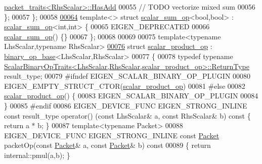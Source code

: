 \begin{DoxyCode}
      \hyperlink{struct_eigen_1_1internal_1_1packet__traits}{packet\_traits<RhsScalar>::HasAdd}
00055     \textcolor{comment}{// TODO vectorize mixed sum}
00056   \};
00057 \};
00058 
\hyperlink{struct_eigen_1_1internal_1_1scalar__sum__op_3_01bool_00_01bool_01_4}{00064} \textcolor{keyword}{template}<> \textcolor{keyword}{struct }\hyperlink{struct_eigen_1_1internal_1_1scalar__sum__op}{scalar\_sum\_op}<bool,bool> : \hyperlink{struct_eigen_1_1internal_1_1scalar__sum__op}{scalar\_sum\_op}<int,int> \{
00065   EIGEN\_DEPRECATED
00066   \hyperlink{struct_eigen_1_1internal_1_1scalar__sum__op}{scalar\_sum\_op}() \{\}
00067 \};
00068 
00069 
00075 \textcolor{keyword}{template}<\textcolor{keyword}{typename} LhsScalar,\textcolor{keyword}{typename} RhsScalar>
\hyperlink{struct_eigen_1_1internal_1_1scalar__product__op}{00076} \textcolor{keyword}{struct }\hyperlink{struct_eigen_1_1internal_1_1scalar__product__op}{scalar\_product\_op}  : \hyperlink{struct_eigen_1_1internal_1_1binary__op__base}{binary\_op\_base}<LhsScalar,RhsScalar>
00077 \{
00078   \textcolor{keyword}{typedef} \textcolor{keyword}{typename} 
      \hyperlink{group___core___module_struct_eigen_1_1_scalar_binary_op_traits}{ScalarBinaryOpTraits<LhsScalar,RhsScalar,scalar\_product\_op>::ReturnType}
       result\_type;
00079 \textcolor{preprocessor}{#ifndef EIGEN\_SCALAR\_BINARY\_OP\_PLUGIN}
00080   EIGEN\_EMPTY\_STRUCT\_CTOR(\hyperlink{struct_eigen_1_1internal_1_1scalar__product__op}{scalar\_product\_op})
00081 \textcolor{preprocessor}{#else}
00082   \hyperlink{struct_eigen_1_1internal_1_1scalar__product__op}{scalar\_product\_op}() \{
00083     EIGEN\_SCALAR\_BINARY\_OP\_PLUGIN
00084   \}
00085 \textcolor{preprocessor}{#endif}
00086   EIGEN\_DEVICE\_FUNC EIGEN\_STRONG\_INLINE \textcolor{keyword}{const} result\_type operator() (\textcolor{keyword}{const} LhsScalar& a, \textcolor{keyword}{const} RhsScalar& 
      b)\textcolor{keyword}{ const }\{ \textcolor{keywordflow}{return} a * b; \}
00087   \textcolor{keyword}{template}<\textcolor{keyword}{typename} Packet>
00088   EIGEN\_DEVICE\_FUNC EIGEN\_STRONG\_INLINE \textcolor{keyword}{const} \hyperlink{union_eigen_1_1internal_1_1_packet}{Packet} packetOp(\textcolor{keyword}{const} \hyperlink{union_eigen_1_1internal_1_1_packet}{Packet}& a, \textcolor{keyword}{const} 
      \hyperlink{union_eigen_1_1internal_1_1_packet}{Packet}& b)\textcolor{keyword}{ const}
00089 \textcolor{keyword}{  }\{ \textcolor{keywordflow}{return} internal::pmul(a,b); \}

\end{DoxyCode}
